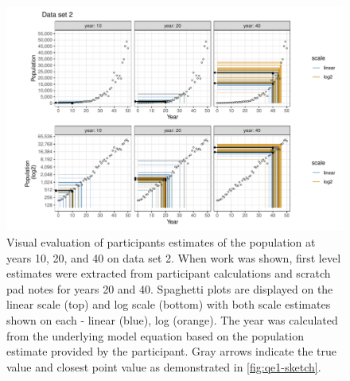 \documentclass[print]{nuthesis}
\begin{document}
\begin{figure}[tbp]

{\centering \includegraphics[width=1\linewidth,]{thesis_files/figure-latex/spaghetti-dataset2-1} 

}

\caption[Estimated population spaghetti plot: data set 2]{Visual evaluation of participants estimates of the population at years 10, 20, and 40 on data set 2. When work was shown, first level estimates were extracted from participant calculations and scratch pad notes for years 20 and 40. Spaghetti plots are displayed on the linear scale (top) and log scale (bottom) with both scale estimates shown on each - linear (blue), log (orange). The year was calculated from the underlying model equation based on the population estimate provided by the participant. Gray arrows indicate the true value and closest point value as demonstrated in \cref{fig:qe1-sketch}.}\label{fig:spaghetti-dataset2}
\end{figure}
\end{document}
